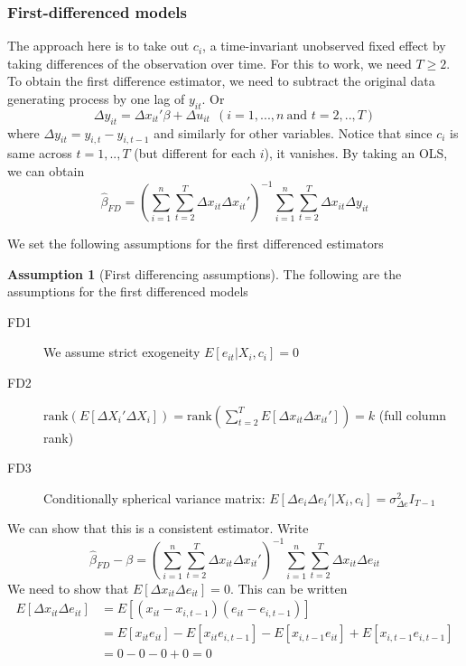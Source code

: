 \documentclass[12pt]{article}
\theoremstyle{definition}
\theoremstyle{property}
\theoremstyle{assumption}
\newtheorem{assumption}{Assumption}[section]
\theoremstyle{example}
\theoremstyle{comment}
\begin{document}
\subsubsection{First-differenced models}
The approach here is to take out $c_i$, a time-invariant unobserved fixed effect by taking differences of the observation over time.  For this to work, we need $T\geq 2$. To obtain the first difference estimator, we need to subtract the original data generating process by one lag of $y_{it}$. Or
\[
\Delta y_{it}= \Delta x_{it}'\beta+\Delta u_{it}\ \ (i=1,...,n \ \text{and }t=2,..,T)
\]
where $\Delta y_{it} = y_{i,t}-y_{i,t-1}$ and similarly for other variables. Notice that since $c_i$ is same across $t=1,..,T$ (but different for each $i$), it vanishes. By taking an OLS, we can obtain
\[
\hat{\beta}_{FD}=\left(\sum_{i=1}^n\sum_{t=2}^T \Delta x_{it}\Delta x_{it}'\right)^{-1}\sum_{i=1}^n\sum_{t=2}^T \Delta x_{it}\Delta y_{it}
\]
\par
We set the following assumptions for the first differenced estimators
\begin{mdframed}[backgroundcolor=blue!5] 
\begin{assumption}[First differencing assumptions]
The following are the assumptions for the first differenced models
\begin{description}
\item[FD1] We assume strict exogeneity $E[e_{it}|X_i,c_i]=0$
\item[FD2] $\text{rank}\left(E [\Delta X_i' \Delta X_i]\right)=\text{rank}\left(\sum_{t=2}^T E [\Delta {x}_{it} \Delta {x}_{it}']\right)=k$ (full column rank)
\item[FD3] Conditionally spherical variance matrix: $E[\Delta e_i\Delta e_i'|X_i,c_i]=\sigma_{\Delta e}^2 I_{T-1}$
\end{description}
\end{assumption}
\end{mdframed}
We can show that this is a consistent estimator. Write
\[
\hat{\beta}_{FD}-\beta =\left(\sum_{i=1}^n\sum_{t=2}^T \Delta x_{it}\Delta x_{it}'\right)^{-1}\sum_{i=1}^n\sum_{t=2}^T \Delta x_{it}\Delta e_{it}
\]
We need to show that $E[\Delta x_{it} \Delta e_{it}]=0$. This can be written
\[
\begin{aligned}
E[\Delta x_{it} \Delta e_{it}]&=E[ (x_{it}-x_{i,t-1})( e_{it}-e_{i,t-1})]\\
&=E[ x_{it}e_{it}]-E[x_{it}e_{i,t-1}]-E[x_{i,t-1}e_{it}]+E[x_{i,t-1}e_{i,t-1}]\\
&= 0-0-0+0=0
\end{aligned}
\] 
\end{document}
